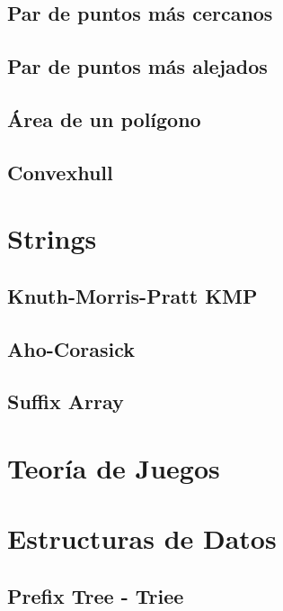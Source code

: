 \documentclass[10pt,letterpaper,twocolumn,twosided]{article}
\begin{document}
\subsection{Par de puntos más cercanos}

\subsection{Par de puntos más alejados}

\subsection{Área de un polígono}

\subsection{Convexhull}

\section{Strings}

\subsection{Knuth-Morris-Pratt KMP}

\subsection{Aho-Corasick}

\subsection{Suffix Array}

\section{Teoría de Juegos}

\section{Estructuras de Datos}

\subsection{Prefix Tree - Triee}
\end{document}
